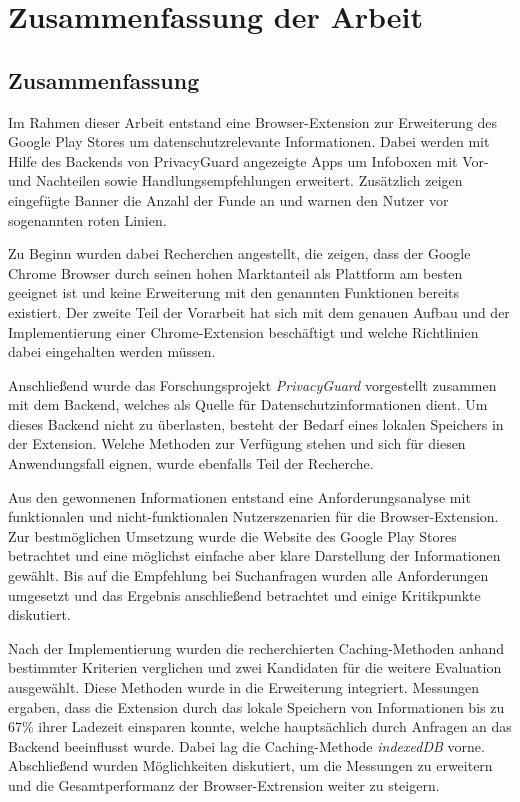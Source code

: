 \chapter{Zusammenfassung der Arbeit}
\label{c:zsm}



\section{Zusammenfassung}
\label{s:zusammenfassung}

Im Rahmen dieser Arbeit entstand eine Browser-Extension zur Erweiterung des Google Play Stores um datenschutzrelevante Informationen. Dabei werden mit Hilfe des Backends von PrivacyGuard angezeigte Apps um Infoboxen mit Vor- und Nachteilen sowie Handlungsempfehlungen erweitert. Zusätzlich zeigen eingefügte Banner die Anzahl der Funde an und warnen den Nutzer vor sogenannten \glqq roten Linien\grqq{}.

Zu Beginn wurden dabei Recherchen angestellt, die zeigen, dass der Google Chrome Browser durch seinen hohen Marktanteil als Plattform am besten geeignet ist und keine Erweiterung mit den genannten Funktionen bereits existiert. Der zweite Teil der Vorarbeit hat sich mit dem genauen Aufbau und der Implementierung einer Chrome-Extension beschäftigt und welche Richtlinien dabei eingehalten werden müssen.

Anschließend wurde das Forschungsprojekt \textit{PrivacyGuard} vorgestellt zusammen mit dem Backend, welches als Quelle für Datenschutzinformationen dient. Um dieses Backend nicht zu überlasten, besteht der Bedarf eines lokalen Speichers in der Extension. Welche Methoden zur Verfügung stehen und sich für diesen Anwendungsfall eignen, wurde ebenfalls Teil der Recherche.

Aus den gewonnenen Informationen entstand eine Anforderungsanalyse mit funktionalen und nicht-funktionalen Nutzerszenarien für die Browser-Extension. Zur bestmöglichen Umsetzung wurde die Website des Google Play Stores betrachtet und eine möglichst einfache aber klare Darstellung der Informationen gewählt. Bis auf die Empfehlung bei Suchanfragen wurden alle Anforderungen umgesetzt und das Ergebnis anschließend betrachtet und einige Kritikpunkte diskutiert.

Nach der Implementierung wurden die recherchierten Caching-Methoden anhand bestimmter Kriterien verglichen und zwei Kandidaten für die weitere Evaluation ausgewählt. Diese Methoden wurde in die Erweiterung integriert. Messungen ergaben, dass die Extension durch das lokale Speichern von Informationen bis zu 67\% ihrer Ladezeit einsparen konnte, welche hauptsächlich durch Anfragen an das Backend beeinflusst wurde. Dabei lag die Caching-Methode \textit{indexedDB} vorne. Abschließend wurden Möglichkeiten diskutiert, um die Messungen zu erweitern und die Gesamtperformanz der Browser-Extrension weiter zu steigern.

